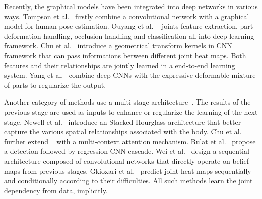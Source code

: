 \documentclass[10pt,twocolumn,letterpaper]{article}
\newcommand{\ForXiao}[1]{\textcolor{red}{(For Xiao: #1)}}
\begin{document}

Recently, the graphical models have been integrated into deep networks in various ways. Tompson et al.~\cite{tompson2014joint} firstly combine a convolutional network with a graphical model for human pose estimation. Ouyang et al. ~\cite{ouyang2013joint} joints feature extraction, part deformation handling, occlusion handling and classification all into deep learning framework. Chu et al.~\cite{chu2016structured} introduce a geometrical transform kernels in CNN framework that can pass informations between different joint heat maps. Both features and their relationships are jointly learned in a end-to-end learning system. Yang et al.~\cite{yang2016end} combine deep CNNs with the expressive deformable mixture of parts to regularize the output.



Another category of methods use a multi-stage architecture~\cite{chu2017multi, carreira2016human, newell2016stacked, bulat2016human, wei2016convolutional, insafutdinov2016deepercut, gkioxari2016chained}. The results of the previous stage are used as inputs to enhance or regularize the learning of the next stage.  Newell et al.~\cite{newell2016stacked} introduce an Stacked Hourglass architecture that better capture the various spatial relationships associated with the body. Chu et al.~\cite{chu2017multi} further extend ~\cite{newell2016stacked} with a multi-context attention mechanism. Bulat et al.~\cite{bulat2016human} propose a detection-followed-by-regression CNN cascade. Wei et al.~\cite{wei2016convolutional} design a sequential architecture composed of convolutional networks that directly operate on belief maps from previous stages. Gkioxari et al.~\cite{gkioxari2016chained} predict joint heat maps sequentially and conditionally according to their difficulties. All such methods learn the joint dependency from data, implicitly.

\end{document}
